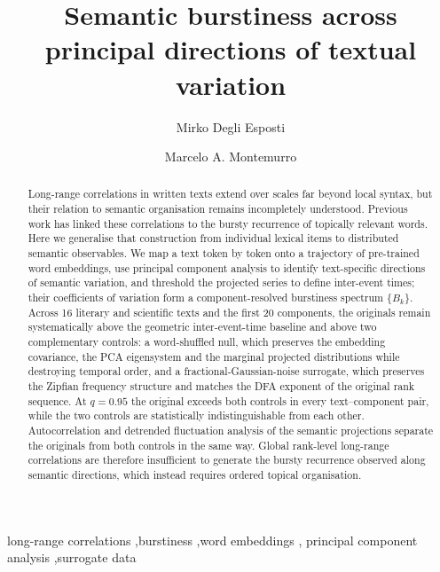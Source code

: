 \documentclass[preprint]{elsarticle}
\begin{document}
\begin{frontmatter}

\title{Semantic burstiness across principal directions of textual
variation}

\author[unibo]{Mirko Degli Esposti}
\author[ou]{Marcelo A. Montemurro}


\begin{abstract}
Long-range correlations in written texts extend over scales far beyond
local syntax, but their relation to semantic organisation remains
incompletely understood. Previous work has linked these correlations to
the bursty recurrence of topically relevant words. Here we generalise
that construction from individual lexical items to distributed semantic
observables. We map a text token by token onto a trajectory of
pre-trained word embeddings, use principal component analysis to
identify text-specific directions of semantic variation, and threshold
the projected series to define inter-event times; their coefficients of
variation form a component-resolved burstiness spectrum $\{B_k\}$.
Across 16 literary and scientific texts and the first 20 components,
the originals remain systematically above the geometric
inter-event-time baseline and above two complementary controls: a
word-shuffled null, which preserves the embedding covariance, the PCA
eigensystem and the marginal projected distributions while destroying
temporal order, and a fractional-Gaussian-noise surrogate, which
preserves the Zipfian frequency structure and matches the DFA exponent
of the original rank sequence. At $q=0.95$ the original exceeds both
controls in every text--component pair, while the two controls are
statistically indistinguishable from each other. Autocorrelation and
detrended fluctuation analysis of the semantic projections separate the
originals from both controls in the same way. Global rank-level
long-range correlations are therefore insufficient to generate the
bursty recurrence observed along semantic directions, which instead
requires ordered topical organisation.
\end{abstract}

\begin{keyword}
long-range correlations \sep burstiness \sep word embeddings \sep
principal component analysis \sep surrogate data
\end{keyword}

\end{frontmatter}
\end{document}
